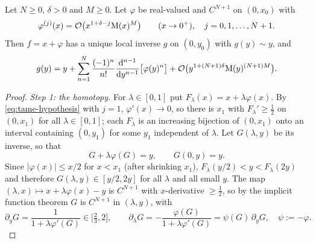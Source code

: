 \begin{theorem}
\label{thm:tame}
Let $N\ge0$, $\delta>0$ and $M\ge0$. Let $\varphi$ be real-valued and $C^{N+1}$ on $(0,x_0)$ with
\begin{equation}
 \varphi^{(j)}(x)=\mathcal O\bigl(x^{1+\delta-j}\mathrm M(x)^M\bigr)\qquad(x\to0^+),\quad j=0,1,\dots,N+1 .
 \label{eq:tame-hypothesis}
\end{equation}
Then $f=x+\varphi$ has a unique local inverse $g$ on $(0,y_0)$ with $g(y)\sim y$, and
\begin{equation}
 g(y)=y+\sum_{n=1}^N\frac{(-1)^n}{n!}\frac{\mathrm d^{n-1}}{\mathrm d y^{n-1}}\bigl[\varphi(y)^n\bigr]+\mathcal O\bigl(y^{1+(N+1)\delta}\mathrm M(y)^{(N+1)M}\bigr).
 \label{eq:tame}
\end{equation}
\end{theorem}
\begin{proof}
\emph{Step 1: the homotopy.} For $\lambda\in[0,1]$ put $F_\lambda(x)=x+\lambda\varphi(x)$. By \eqref{eq:tame-hypothesis} with $j=1$, $\varphi'(x)\to0$, so there is $x_1$ with $F_\lambda'\ge\frac12$ on $(0,x_1)$ for all $\lambda\in[0,1]$; each $F_\lambda$ is an increasing bijection of $(0,x_1)$ onto an interval containing $(0,y_1)$ for some $y_1$ independent of $\lambda$. Let $G(\lambda,y)$ be its inverse, so that
\begin{equation}
 G+\lambda\varphi(G)=y,\qquad G(0,y)=y .
 \label{eq:homotopy}
\end{equation}
Since $|\varphi(x)|\le x/2$ for $x<x_1$ (after shrinking $x_1$), $F_\lambda(y/2)<y<F_\lambda(2y)$ and therefore $G(\lambda,y)\in[y/2,2y]$ for all $\lambda$ and all small $y$. The map $(\lambda,x)\mapsto x+\lambda\varphi(x)-y$ is $C^{N+1}$ with $x$-derivative $\ge\frac12$, so by the implicit function theorem $G$ is $C^{N+1}$ in $(\lambda,y)$, with
\begin{equation}
 \partial_yG=\frac1{1+\lambda\varphi'(G)}\in\bigl[\tfrac23,2\bigr],\qquad \partial_\lambda G=-\frac{\varphi(G)}{1+\lambda\varphi'(G)}=\psi(G)\,\partial_yG,\quad\psi:=-\varphi .
 \label{eq:transport-pde}
\end{equation}


\end{proof}
